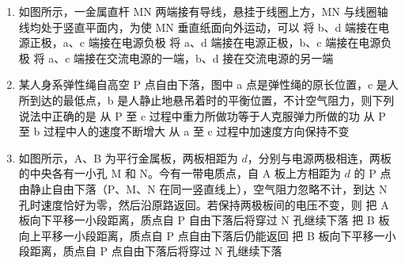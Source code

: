 \documentclass[\gkver]{gaokaozhenti}
\begin{document}
\begin{enumerate}

\item
如图所示，一金属直杆 MN 两端接有导线，悬挂于线圈上方，MN 与线圈轴线均处于竖直平面内，为使 MN 垂直纸面向外运动，可以
\onepicture[w=3.34cm]{}
{将 b、d 端接在电源正极，a、c 端接在电源负极}
{将 a、d 端接在电源正极，b、c 端接在电源负极}
{将 a、c 端接在交流电源的一端，b、d 接在交流电源的另一端}


\item
某人身系弹性绳自高空 P 点自由下落，图中 a 点是弹性绳的原长位置，c 是人所到达的最低点，b 是人静止地悬吊着时的平衡位置，不计空气阻力，则下列说法中正确的是
\onepicture[h=5.28cm]{}
{从 P 至 c 过程中重力所做功等于人克服弹力所做的功}
{从 P 至 b 过程中人的速度不断增大}
{从 a 至 c 过程中加速度方向保持不变}


\item
如图所示，A、B 为平行金属板，两板相距为 $d$，分别与电源两极相连，两板的中央各有一小孔 M 和 N。今有一带电质点，自 A 板上方相距为 $d$ 的 P 点由静止自由下落（P、M、N 在同一竖直线上），空气阻力忽略不计，到达 N 孔时速度恰好为零，然后沿原路返回。若保持两极板间的电压不变，则
\onepicture[w=5.65cm]{}
{把 A 板向下平移一小段距离，质点自 P 自由下落后将穿过 N 孔继续下落}
{把 B 板向上平移一小段距离，质点自 P 点自由下落后仍能返回}
{把 B 板向下平移一小段距离，质点自 P 点自由下落后将穿过 N 孔继续下落}


\end{enumerate}
\end{document}
